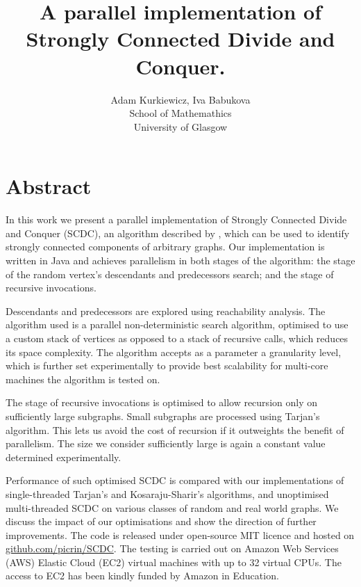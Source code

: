 \documentclass{article}
\title{A parallel implementation of Strongly Connected Divide and Conquer.}
\author{Adam Kurkiewicz, Iva Babukova\\ School of Mathemathics\\ University of Glasgow}
\date{}
\begin{document}
\maketitle

\section{Abstract}

\par
In this work we present a parallel implementation of Strongly Connected Divide and Conquer (SCDC), an algorithm described by \textcite{fleischer00}, which can be used to identify strongly connected components of arbitrary graphs. Our implementation is written in Java and achieves parallelism in both stages of the algorithm: the stage of the random vertex's descendants and predecessors search; and the stage of recursive invocations.

\par
Descendants and predecessors are explored using reachability analysis. The algorithm used is a parallel non-deterministic search algorithm, optimised to use a custom stack of vertices as opposed to a stack of recursive calls, which reduces its space complexity. The algorithm accepts as a parameter a granularity level, which is further set experimentally to provide best scalability for multi-core machines the algorithm is tested on.

\par
The stage of recursive invocations is optimised to allow recursion only on sufficiently large subgraphs. Small subgraphs are processed using Tarjan's \cite{tarjan72} algorithm. This lets us avoid the cost of recursion if it outweights the benefit of parallelism. The size we consider sufficiently large is again a constant value determined experimentally.

\par
Performance of such optimised SCDC is compared with our implementations of single-threaded Tarjan's \cite{tarjan72} and Kosaraju-Sharir's \cite{sharir81} algorithms, and unoptimised multi-threaded SCDC \cite{fleischer00} on various classes of random and real world graphs. We discuss the impact of our optimisations and show the direction of further improvements. The code is released under open-source MIT licence and hosted on \href{http://github.com/picrin/SCDC}{github.com/picrin/SCDC}. The testing is carried out on Amazon Web Services (AWS) Elastic Cloud (EC2) virtual machines with up to 32 virtual CPUs. The access to EC2 has been kindly funded by Amazon in Education.

\printbibliography
\end{document}
